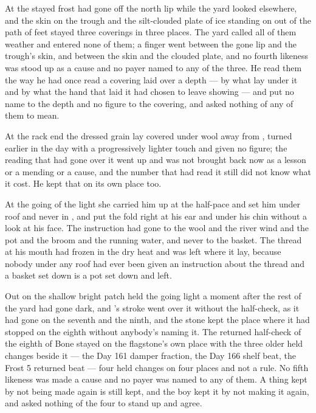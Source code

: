 At  the stayed frost had gone off the north lip while the yard looked elsewhere, and the skin on the trough and the silt-clouded plate of ice standing on  out of the path of feet stayed three coverings in three places. The yard called all of them weather and entered none of them; a finger went between the gone lip and the trough's skin, and between the skin and the clouded plate, and no fourth likeness was stood up as a cause and no payer named to any of the three. He read them the way he had once read a covering laid over a depth --- by what lay under it and by what the hand that laid it had chosen to leave showing --- and put no name to the depth and no figure to the covering, and asked nothing of any of them to mean.

At the rack end the dressed grain lay covered under wool away from , turned earlier in the day with a progressively lighter touch and given no figure; the reading that had gone over it went up  and was not brought back now as a lesson or a mending or a cause, and the number that had read it still did not know what it cost. He kept that on its own place too.

At the going of the light she carried him up at the half-pace and set him under  roof and never in , and put the fold right at his ear and under his chin without a look at his face. The instruction had gone to the wool and the river wind and the pot and the broom and the running water, and never to the basket. The thread at his mouth had frozen in the dry heat and was left where it lay, because nobody under any roof had ever been given an instruction about the thread and a basket set down is a pot set down and left.

\scenebreak

Out on  the shallow bright patch held the going light a moment after the rest of the yard had gone dark, and 's stroke went over it without the half-check, as it had gone on the seventh and the ninth, and the stone kept the place where it had stopped on the eighth without anybody's naming it. The returned half-check of the eighth of Bone stayed on the flagstone's own place with the three older held changes beside it --- the Day 161 damper fraction, the Day 166 shelf beat, the Frost 5 returned beat --- four held changes on four places and not a rule. No fifth likeness was made a cause and no payer was named to any of them. A thing kept by not being made again is still kept, and the boy kept it by not making it again, and asked nothing of the four to stand up and agree.

